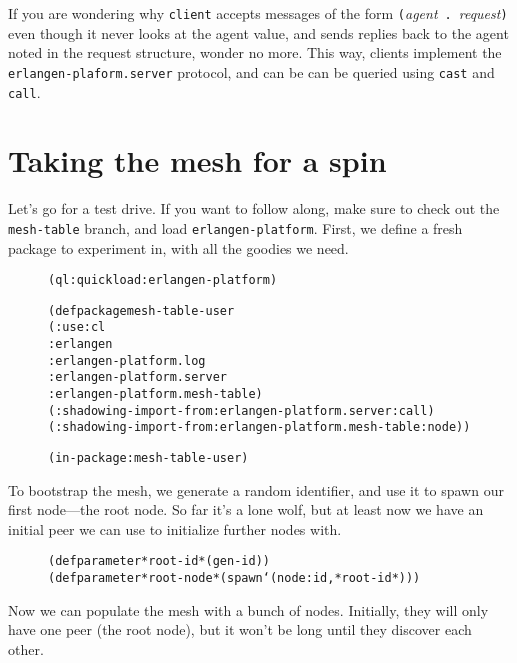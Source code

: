 \documentclass [a4paper,12pt,oneside]{article}\usepackage [paper=a4paper,left=37.5264mm,right=37.5264mm,top=37.5264mm,bottom=37.5264mm]{geometry}\usepackage {graphicx}\usepackage {tabularx}\usepackage {alltt}\usepackage {float}\usepackage [section]{placeins}\usepackage {titling}\setlength {\droptitle }{-4em}\pretitle {\begin {flushright}\bfseries \LARGE }\posttitle {\end {flushright}}\preauthor {\begin {flushright}}\postauthor {\end {flushright}}\predate {\begin {flushright}}\postdate {\end {flushright}}\usepackage [english]{babel}\usepackage [T1]{fontenc}\usepackage [utf8x]{inputenc}\usepackage {stmaryrd}\usepackage {amsfonts}\DeclareUnicodeCharacter {12314}{$\llbracket $}\DeclareUnicodeCharacter {12315}{$\rrbracket $}\DeclareUnicodeCharacter {9655}{$\rhd $}\newcommand \nobreakdash {\mbox {-}}\DeclareUnicodeCharacter {8209}{\nobreakdash }\usepackage [sc]{mathpazo}\linespread {1.05}\usepackage [font={small},labelformat=empty,labelsep=none]{caption}\tolerance=10000 \clubpenalty=10000 \widowpenalty=10000 \frenchspacing
\begin{document}
If you are wondering why \texttt {client} accepts messages of the form \texttt {(}\textit {agent} \texttt {.} \textit {request}\texttt {)} even though it never looks at the agent value, and sends replies back to the agent noted in the request structure, wonder no more. This way, clients implement the \texttt {erlangen-plaform.server} protocol, and can be can be queried using \texttt {cast} and \texttt {call}.



\section* {Taking the mesh for a spin}

Let’s go for a test drive. If you want to follow along, make sure to check out the \texttt {mesh-table} branch, and load \texttt {erlangen-platform}. First, we define a fresh package to experiment in, with all the goodies we need.

\begin {figure}[H]\centering \begin {alltt}
(ql:quickload :erlangen-platform)

(defpackage mesh-table-user
  (:use :cl
        :erlangen
        :erlangen-platform.log
        :erlangen-platform.server
        :erlangen-platform.mesh-table)
  (:shadowing-import-from :erlangen-platform.server :call)
  (:shadowing-import-from :erlangen-platform.mesh-table :node))

(in-package :mesh-table-user)
\end{alltt}\vspace {-1em}\end {figure}

To bootstrap the mesh, we generate a random identifier, and use it to spawn our first node—the root node. So far it’s a lone wolf, but at least now we have an initial peer we can use to initialize further nodes with.

\begin {figure}[H]\centering \begin {alltt}
(defparameter *root-id* (gen-id))
(defparameter *root-node* (spawn `(node :id ,*root-id*)))
\end{alltt}\vspace {-1em}\end {figure}

Now we can populate the mesh with a bunch of nodes. Initially, they will only have one peer (the root node), but it won’t be long until they discover each other.
\end{document}
